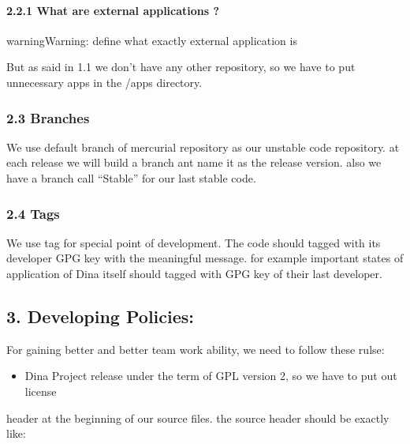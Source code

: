 \documentclass[letterpaper,10pt,english]{manual}
\begin{document}
\paragraph{2.2.1 What are external applications ?}

\begin{notice}{warning}{Warning:}
define what exactly external application is
\end{notice}

But as said in 1.1 we don't have any other repository, so we have to put unnecessary apps
in the /apps directory.


\subsubsection{2.3 Branches}

We use default branch of mercurial repository as our unstable code repository. at each
release we will build a branch ant name it as the release version. also we have a branch
call ``Stable'' for our last stable code.


\subsubsection{2.4 Tags}

We use tag for special point of development. The code should tagged with its developer
GPG key with the meaningful message. for example important states of application of Dina
itself should tagged with GPG key of their last developer.


\subsection{3. Developing Policies:}

For gaining better and better team work ability, we need to follow these rulse:
\begin{itemize}
\item {} 
Dina Project release under the term of GPL version 2, so we have to put out license

\end{itemize}

header at the beginning of our source files. the source header should be exactly like:
\end{document}
